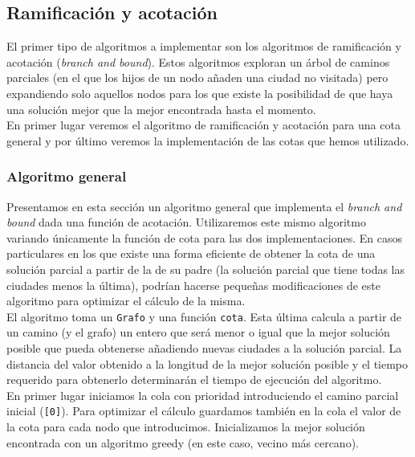 \subsection{Ramificación y acotación}

El primer tipo de algoritmos a implementar son los algoritmos de ramificación y acotación
(\textit{branch and bound}). Estos algoritmos exploran un árbol de caminos parciales (en el que los hijos de un nodo añaden una ciudad no visitada) pero expandiendo solo aquellos nodos para los que existe la posibilidad de que haya una solución mejor que la mejor
encontrada hasta el momento. \\

En primer lugar veremos el algoritmo de ramificación y acotación para una cota general y por último veremos la implementación de las cotas que hemos utilizado.

\subsubsection{Algoritmo general}

Presentamos en esta sección un algoritmo general que implementa el \textit{branch and bound} dada una función de acotación. Utilizaremos este mismo algoritmo variando únicamente la función de cota para las dos implementaciones. En casos particulares en los que existe una forma eficiente de obtener la cota de una solución parcial a partir de la de su padre (la solución parcial que tiene todas las ciudades menos la última), podrían hacerse pequeñas modificaciones de este algoritmo para optimizar el cálculo de la misma. \\

El algoritmo toma un \texttt{Grafo} y una función \texttt{cota}. Esta última calcula a partir de un camino (y el grafo) un entero que será menor o igual que la mejor solución posible que pueda obtenerse añadiendo nuevas ciudades a la solución parcial. La distancia del valor obtenido a la longitud de la mejor solución posible y el tiempo requerido para obtenerlo determinarán el tiempo de ejecución del algoritmo.  \\

En primer lugar iniciamos la cola con prioridad introduciendo el camino parcial
inicial (\texttt{[0]}). Para optimizar el cálculo guardamos también en la cola el valor de la cota para cada nodo que introducimos. Inicializamos la mejor solución encontrada con un algoritmo greedy (en este caso, vecino más cercano).

